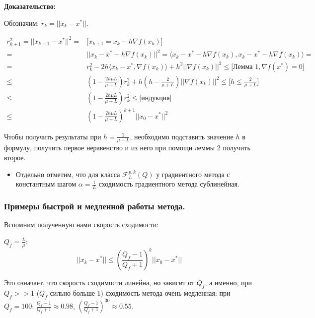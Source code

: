 {\bf Доказательство:}

Обозначим: $r_k = ||x_k - x^*||$.

\begin{align*}
r_{k+1}^2 = ||x_{k+1} - x^*||^2 = &
\Bigg [
    x_{k+1} = x_k - h \nabla f(x_k)
\Bigg]\\
= & ||x_k - x^* -  h \nabla f(x_k)||^2 =
\langle
    x_k - x^* -  h \nabla f(x_k), x_k - x^* -  h \nabla f(x_k)
\rangle = \\
=& r_k^2
- 2h \langle
    x_k - x^*, \nabla f(x_k)
\rangle
+ h^2 ||\nabla f(x_k)||^2 \leqslant
\Bigg [
    \text{Лемма 1}, \nabla f(x^*)=0
\Bigg]\\
\leqslant &
\left(
    1 - \frac{2h\mu L}{\mu + L}
\right)
r_k^2 +
h
\left(
    h - \frac{2}{\mu + L}
\right)
||\nabla f(x_k)||^2 \leqslant
\Bigg [
    h \leqslant \frac{2}{\mu + L}
\Bigg]\\
\leqslant &
\left(
    1 - \frac{2h\mu L}{\mu + L}
\right)
r_k^2  \leqslant
\Bigg [
   \text{индукция}
\Bigg]\\
\leqslant &
\left(
    1 - \frac{2h\mu L}{\mu + L}
\right)^{k+1}
||x_0 - x^*||^2
\end{align*}


Чтобы получить результаты при $h=\frac{2}{\mu + L}$,
необходимо подставить значение $h$ в формулу, получить первое неравенство и из него при помощи леммы 2 получить второе.


\begin{itemize}
    \item Отдельно отметим, что для класса
$\mathscr{F}_L^{p,k}(Q)$ у градиентного метода с константным шагом $\alpha = \frac{1}{L}$ сходимость  градиентного метода сублинейная.
\end{itemize}


\subsubsection{Примеры быстрой и медленной работы метода.}


Вспомним полученную нами скорость сходимости:

$Q_f = \frac{L}{\mu}$:
\begin{equation*}
    ||x_k - x^*|| \leqslant
    \left(
        \frac{Q_f - 1}{Q_f + 1}
    \right)^k
    ||x_0 - x^*||
\end{equation*}

Это означает, что скорость сходимости линейна, но зависит от $Q_f$, а именно, при $Q_f >> 1$ ($Q_f$ сильно больше 1) сходимость метода очень медленная: при $Q_f = 100 $:
$\frac{Q_f - 1}{Q_f + 1} \approx 0.98$,
$\left(
    \frac{Q_f - 1}{Q_f + 1}
\right)^{30} \approx 0.55$.


